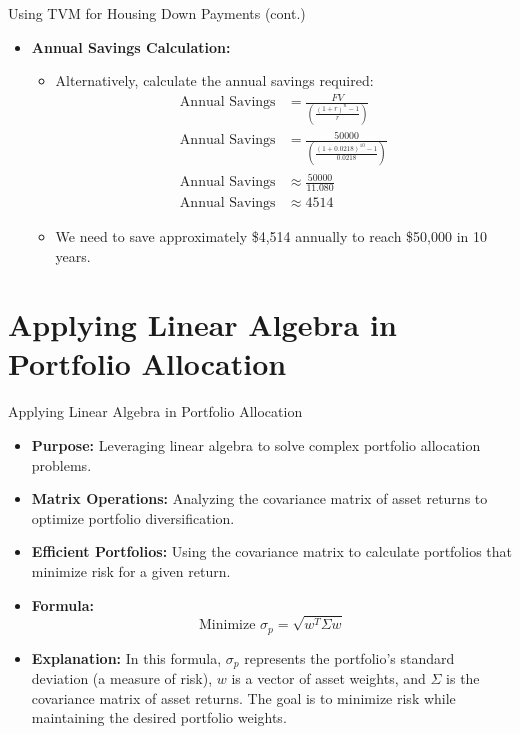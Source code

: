 \documentclass{beamer}
\begin{document}
\begin{frame}{Using TVM for Housing Down Payments (cont.)}
    \begin{itemize}
        \item \textbf{Annual Savings Calculation:}
        \begin{itemize}
            \item Alternatively, calculate the annual savings required:
            \begin{align*}
                \text{Annual Savings} &= \frac{FV}{\left( \frac{(1 + r)^n - 1}{r} \right)} \\
                \text{Annual Savings} &= \frac{50000}{\left( \frac{(1 + 0.0218)^{10} - 1}{0.0218} \right)} \\
                \text{Annual Savings} &\approx \frac{50000}{11.080} \\
                \text{Annual Savings} &\approx 4514
            \end{align*}
            \item We need to save approximately \$4,514 annually to reach \$50,000 in 10 years.
        \end{itemize}
    \end{itemize}
\end{frame}

\section{Applying Linear Algebra in Portfolio Allocation}
\begin{frame}{Applying Linear Algebra in Portfolio Allocation}
    \begin{itemize}
        \item \textbf{Purpose:} Leveraging linear algebra to solve complex portfolio allocation problems.
        \item \textbf{Matrix Operations:} Analyzing the covariance matrix of asset returns to optimize portfolio diversification.
        \item \textbf{Efficient Portfolios:} Using the covariance matrix to calculate portfolios that minimize risk for a given return.
        \item \textbf{Formula:}
        \begin{equation*}
            \text{Minimize } \sigma_p = \sqrt{w^T \Sigma w}
        \end{equation*}
        \item \textbf{Explanation:} In this formula, \( \sigma_p \) represents the portfolio's standard deviation (a measure of risk), \( w \) is a vector of asset weights, and \( \Sigma \) is the covariance matrix of asset returns. The goal is to minimize risk while maintaining the desired portfolio weights.
    \end{itemize}
\end{frame}
\end{document}
